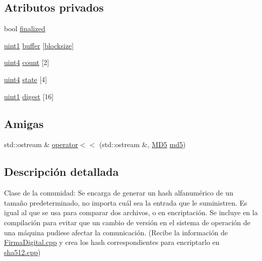 \subsection*{Atributos privados}
\begin{DoxyCompactItemize}
\item 
bool \hyperlink{classMD5_a696e995f7045cf0146a207c720386f9c}{finalized}
\item 
\hyperlink{classMD5_a3b1c4901139aef256ee49c4ab14d09f9}{uint1} \hyperlink{classMD5_a0df603b8332399d5c1daa08ab5a315ea}{buffer} \mbox{[}\hyperlink{classMD5_a227e6f16f2409956b516b453e6bc7429a1cc0a742ca803f75a021aef77b522963}{blocksize}\mbox{]}
\item 
\hyperlink{classMD5_a2e5b84a3d7db292f49873061214a0444}{uint4} \hyperlink{classMD5_a52a9ff26a3de9e831b17c1740aa5388a}{count} \mbox{[}2\mbox{]}
\item 
\hyperlink{classMD5_a2e5b84a3d7db292f49873061214a0444}{uint4} \hyperlink{classMD5_aae3f861952f5b129463f550170836db0}{state} \mbox{[}4\mbox{]}
\item 
\hyperlink{classMD5_a3b1c4901139aef256ee49c4ab14d09f9}{uint1} \hyperlink{classMD5_a31058e1dca10bbf29818bb5177ff02ac}{digest} \mbox{[}16\mbox{]}
\end{DoxyCompactItemize}
\subsection*{Amigas}
\begin{DoxyCompactItemize}
\item 
std\+::ostream \& \hyperlink{classMD5_a0739666fd0f3a7117546f6c50e0783b2}{operator$<$$<$} (std\+::ostream \&, \hyperlink{classMD5}{M\+D5} \hyperlink{md5_8h_a92c6eed2e9b51298af559aff6792770b}{md5})
\end{DoxyCompactItemize}


\subsection{Descripción detallada}
Clase de la comunidad\+: Se encarga de generar un hash alfanumérico de un tamaño predeterminado, no importa cuál sea la entrada que le suministren. Es igual al que se usa para comparar dos archivos, o en encriptación. Se incluye en la compilación para evitar que un cambio de versión en el sistema de operación de una máquina pudiese afectar la comunicación. (Recibe la información de \hyperlink{FirmaDigital_8cpp}{Firma\+Digital.\+cpp} y crea los hash correspondientes para encriptarlo en \hyperlink{sha512_8cpp}{sha512.\+cpp}) 

